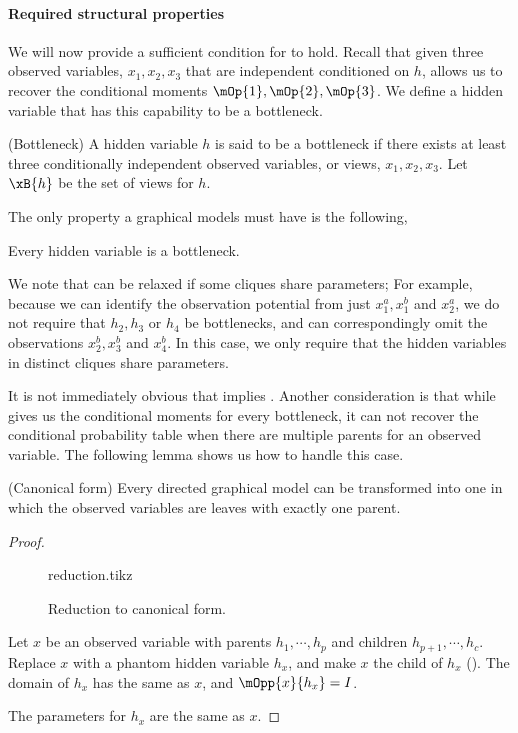 
\paragraph{Required structural properties}

We will now provide a sufficient condition for
 to hold. 
Recall that given three observed
variables, $x_1, x_2, x_3$ that are independent conditioned on $h$,
\TensorFactorize allows us to recover the conditional moments $\mOp{1},
\mOp{2}, \mOp{3}$. We define a hidden variable that has this capability to be a bottleneck.
\begin{definition}(Bottleneck)
  A hidden variable $h$ is said to be a bottleneck if there exists at
    least three conditionally independent observed variables, or views,
    $x_1, x_2, x_3$. 
  Let $\xB{h}$ be the set of views for $h$.
\end{definition}

The only property a graphical models must have is the following,
\begin{property}
  \label{prop:bottleneck}
  Every hidden variable is a bottleneck.
\end{property}

We note that  can be relaxed if some cliques
  share parameters;
For example, because we can identify the observation potential from just
  $x^a_1, x^b_1$ and $x^a_2$, we do not require that $h_2, h_3$ or $h_4$
  be bottlenecks, and can correspondingly omit the observations $x^b_2,
  x^b_3$ and $x^b_4$.
In this case, we only require that the hidden variables in distinct
  cliques share parameters.

It is not immediately obvious that  implies
  . 
Another consideration is that while
  \TensorFactorize gives us the conditional moments for every
  bottleneck, it can not recover the conditional probability table when
  there are multiple parents for an observed variable.
The following lemma shows us how to handle this case.

\begin{lemma}(Canonical form) 
  Every directed graphical model can be transformed into one in which
  the observed variables are leaves with exactly one parent.
\end{lemma}
\begin{proof}
  \begin{figure}
    \label{fig:reduction}
    \centering
    {reduction.tikz}
    \caption{Reduction to canonical form.}
  \end{figure}

  Let $x$ be an observed variable with parents $h_1, \cdots, h_p$ and
  children $h_{p+1}, \cdots, h_c$. Replace $x$ with a phantom hidden
  variable $h_x$, and make $x$ the child of $h_x$ (). The domain of $h_x$
  has the same as $x$, and $\mOpp{x}{h_x} = I$.

  The parameters for $h_x$ are the same as $x$.
\end{proof}

